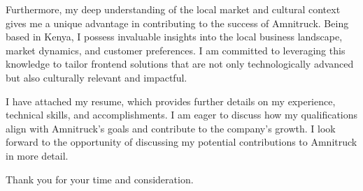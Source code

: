 \documentclass[11pt, a4paper]{configuration}
\begin{document}
\begin{cvletter}
Furthermore, my deep understanding of the local market and cultural context gives me a unique advantage in contributing to the success of Amnitruck. Being based in Kenya, I possess invaluable insights into the local business landscape, market dynamics, and customer preferences. I am committed to leveraging this knowledge to tailor frontend solutions that are not only technologically advanced but also culturally relevant and impactful.

I have attached my resume, which provides further details on my experience, technical skills, and accomplishments. I am eager to discuss how my qualifications align with Amnitruck's goals and contribute to the company's growth. I look forward to the opportunity of discussing my potential contributions to Amnitruck in more detail.

Thank you for your time and consideration.

\end{cvletter}


\makeletterclosing
\end{document}

